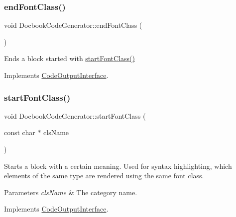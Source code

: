 \subsubsection{\texorpdfstring{endFontClass()}{endFontClass()}}
{\footnotesize\ttfamily void Docbook\+Code\+Generator\+::end\+Font\+Class (\begin{DoxyParamCaption}{ }\end{DoxyParamCaption})\hspace{0.3cm}{\ttfamily [virtual]}}

Ends a block started with \mbox{\hyperlink{class_docbook_code_generator_ab39e3a862244d1c8926895d69240ca0d}{start\+Font\+Class()}} 

Implements \mbox{\hyperlink{class_code_output_interface_a2b8ac05a391dae36793aa3aa8714a0f6}{Code\+Output\+Interface}}.

\mbox{\label{class_docbook_code_generator_ab39e3a862244d1c8926895d69240ca0d}} 
\subsubsection{\texorpdfstring{startFontClass()}{startFontClass()}}
{\footnotesize\ttfamily void Docbook\+Code\+Generator\+::start\+Font\+Class (\begin{DoxyParamCaption}\item[{const char $\ast$}]{cls\+Name }\end{DoxyParamCaption})\hspace{0.3cm}{\ttfamily [virtual]}}

Starts a block with a certain meaning. Used for syntax highlighting, which elements of the same type are rendered using the same \textquotesingle{}font class\textquotesingle{}. 
\begin{DoxyParams}{Parameters}
{\em cls\+Name} & The category name. \\
\hline
\end{DoxyParams}


Implements \mbox{\hyperlink{class_code_output_interface_ac90f75968cdcf127e0b02938bdb49d87}{Code\+Output\+Interface}}.

\mbox{\label{class_docbook_code_generator_ac0f7f4cd4fec98da2855978adf786a04}} 
